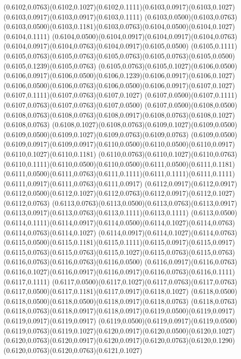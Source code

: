 (0.6102,0.0763)(0.6102,0.1027)(0.6102,0.1111)(0.6103,0.0917)(0.6103,0.1027)(0.6103,0.0917)(0.6103,0.0917)(0.6103,0.1111)
(0.6103,0.0500)(0.6103,0.0763)(0.6103,0.0500)(0.6103,0.1181)(0.6103,0.0763)(0.6104,0.0500)(0.6104,0.1027)(0.6104,0.1111)
(0.6104,0.0500)(0.6104,0.0917)(0.6104,0.0917)(0.6104,0.0763)(0.6104,0.0917)(0.6104,0.0763)(0.6104,0.0917)(0.6105,0.0500)
(0.6105,0.1111)(0.6105,0.0763)(0.6105,0.0763)(0.6105,0.0763)(0.6105,0.0763)(0.6105,0.0500)(0.6105,0.1239)(0.6105,0.0763)
(0.6105,0.0763)(0.6105,0.1027)(0.6106,0.0500)(0.6106,0.0917)(0.6106,0.0500)(0.6106,0.1239)(0.6106,0.0917)(0.6106,0.1027)
(0.6106,0.0500)(0.6106,0.0763)(0.6106,0.0500)(0.6106,0.0917)(0.6107,0.1027)(0.6107,0.1111)(0.6107,0.0763)(0.6107,0.1027)
(0.6107,0.0500)(0.6107,0.1111)(0.6107,0.0763)(0.6107,0.0763)(0.6107,0.0500)
\PST@Solid(0.6107,0.0500)(0.6108,0.0500)(0.6108,0.0763)(0.6108,0.0763)(0.6108,0.0917)(0.6108,0.0763)(0.6108,0.1027)(0.6108,0.0763)
(0.6108,0.1027)(0.6108,0.0763)(0.6109,0.1027)(0.6109,0.0500)(0.6109,0.0500)(0.6109,0.1027)(0.6109,0.0763)(0.6109,0.0763)
(0.6109,0.0500)(0.6109,0.0917)(0.6109,0.0917)(0.6110,0.0500)(0.6110,0.0500)(0.6110,0.0917)(0.6110,0.1027)(0.6110,0.1181)
(0.6110,0.0763)(0.6110,0.1027)(0.6110,0.0763)(0.6110,0.1111)(0.6110,0.0500)(0.6110,0.0500)(0.6111,0.0500)(0.6111,0.1181)
(0.6111,0.0500)(0.6111,0.0763)(0.6111,0.1111)(0.6111,0.1111)(0.6111,0.1111)(0.6111,0.0917)(0.6111,0.0763)(0.6111,0.0917)
(0.6112,0.0917)(0.6112,0.0917)(0.6112,0.0500)(0.6112,0.1027)(0.6112,0.0763)(0.6112,0.0917)(0.6112,0.1027)(0.6112,0.0763)
(0.6113,0.0763)(0.6113,0.0500)(0.6113,0.0763)(0.6113,0.0917)(0.6113,0.0917)(0.6113,0.0763)(0.6113,0.1111)(0.6113,0.1111)
(0.6113,0.0500)(0.6114,0.1111)(0.6114,0.0917)(0.6114,0.0500)(0.6114,0.1027)(0.6114,0.0763)(0.6114,0.0763)(0.6114,0.1027)
(0.6114,0.0917)(0.6114,0.1027)(0.6114,0.0763)(0.6115,0.0500)(0.6115,0.1181)(0.6115,0.1111)(0.6115,0.0917)(0.6115,0.0917)
(0.6115,0.0763)(0.6115,0.0763)(0.6115,0.1027)(0.6115,0.0763)(0.6115,0.0763)(0.6116,0.0763)(0.6116,0.0763)(0.6116,0.0500)
(0.6116,0.0917)(0.6116,0.0763)(0.6116,0.1027)(0.6116,0.0917)(0.6116,0.0917)(0.6116,0.0763)(0.6116,0.1111)(0.6117,0.1111)
(0.6117,0.0500)(0.6117,0.1027)(0.6117,0.0763)(0.6117,0.0763)(0.6117,0.0500)(0.6117,0.1181)(0.6117,0.0917)(0.6118,0.1027)
(0.6118,0.0500)(0.6118,0.0500)(0.6118,0.0500)(0.6118,0.0917)(0.6118,0.0763)
\PST@Solid(0.6118,0.0763)(0.6118,0.0763)(0.6118,0.0917)(0.6118,0.0917)(0.6119,0.0500)(0.6119,0.0917)(0.6119,0.0917)(0.6119,0.0917)
(0.6119,0.0500)(0.6119,0.0917)(0.6119,0.0500)(0.6119,0.0763)(0.6119,0.1027)(0.6120,0.0917)(0.6120,0.0500)(0.6120,0.1027)
(0.6120,0.0763)(0.6120,0.0917)(0.6120,0.0917)(0.6120,0.0763)(0.6120,0.1290)(0.6120,0.0763)(0.6120,0.0763)(0.6121,0.1027)
